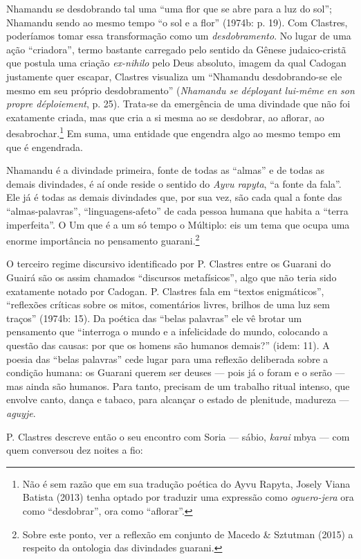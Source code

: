 {{Nhamandu se desdobrando tal uma ``uma flor que se abre para a luz do
sol''; Nhamandu sendo ao mesmo tempo ``o sol e a flor'' (1974b: p. 19).
Com Clastres, poderíamos tomar essa transformação como um
\emph{desdobramento}. No lugar de uma ação ``criadora'', termo bastante
carregado pelo sentido da Gênese judaico-cristã que postula uma criação
\emph{ex-nihilo} pelo Deus absoluto, imagem da qual Cadogan justamente
quer escapar, Clastres visualiza um ``Nhamandu desdobrando-se ele mesmo
em seu próprio desdobramento'' (\emph{Nhamandu se déployant lui-même en son
propre déploiement}, p. 25). Trata-se da emergência de uma divindade
que não foi exatamente criada, mas que cria a si mesma ao se desdobrar,
ao aflorar, ao desabrochar.\footnote{Não é sem razão que em sua
tradução poética do Ayvu Rapyta, Josely Viana Batista (2013) tenha
optado por traduzir uma expressão como \emph{oguero-jera} ora como
``desdobrar'', ora como ``aflorar''.}  Em suma, uma entidade que engendra
algo ao mesmo tempo em que é engendrada.

Nhamandu é a divindade primeira, fonte de todas as ``almas'' e de todas as
demais divindades, é aí onde reside o sentido do \emph{Ayvu rapyta}, ``a fonte
da fala''. Ele já é todas as demais divindades que, por sua vez, são
cada qual a fonte das ``almas-palavras'', ``linguagens-afeto'' de cada
pessoa humana que habita a ``terra imperfeita''. O Um que é a um só tempo
o Múltiplo: eis um tema que ocupa uma enorme importância no pensamento
guarani.\footnote{Sobre este ponto, ver a reflexão em conjunto de
Macedo \& Sztutman (2015) a respeito da ontologia das divindades
guarani.}

O terceiro regime discursivo identificado por P. Clastres entre os
Guarani do Guairá são os assim chamados ``discursos metafísicos'', algo
que não teria sido exatamente notado por Cadogan. P. Clastres fala em
``textos enigmáticos'', ``reflexões críticas sobre os mitos, comentários
livres, brilhos de uma luz sem traços'' (1974b: 15). Da poética das
``belas palavras'' ele vê brotar um pensamento que ``interroga o mundo e a
infelicidade do mundo, colocando a questão das causas: por que os
homens são humanos demais?'' (idem: 11). A poesia das ``belas palavras''
cede lugar para uma reflexão deliberada sobre a condição humana: os
Guarani querem ser deuses --- pois já o foram e o serão --- mas ainda são
humanos. Para tanto, precisam de um trabalho ritual intenso, que
envolve canto, dança e tabaco, para alcançar o estado de plenitude,
madureza --- \emph{aguyje}. 

P. Clastres descreve então o seu encontro com Soria --- sábio, \emph{karai} mbya
--- com quem conversou dez noites a fio:

}}

